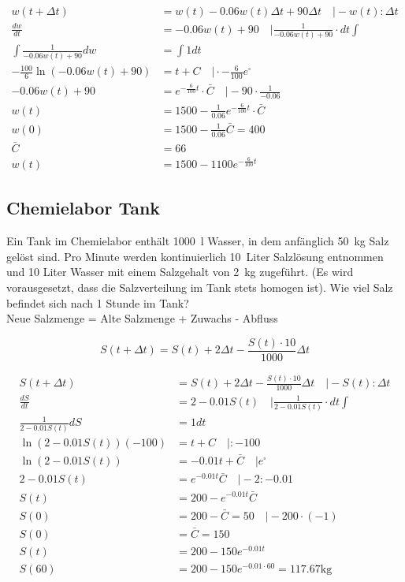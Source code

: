 \documentclass[a4paper, ngerman, 11pt]{scrarticle}
\begin{document}
	\begin{align*}
		w(t+\Delta t) &= w(t) - 0.06w(t)\Delta t + 90 \Delta t \quad \vert -w(t) : \Delta t\\
		\frac{dw}{dt} &= - 0.06w(t) + 90 \quad \vert \frac{1}{- 0.06w(t) + 90} \cdot dt \int\\
		\int\frac{1}{- 0.06w(t) + 90} dw &= \int1 dt\\
		-\frac{100}{6} \ln(- 0.06w(t) + 90) &= t + C \quad \vert \cdot -\frac{6}{100} e^\square\\
		- 0.06w(t) + 90 &= e^{-\frac{6}{100}t} \cdot \bar{C} \quad \vert -90 \cdot \frac{1}{-0.06}\\
		w(t) &= 1500 -\frac{1}{0.06}e^{-\frac{6}{100}t} \cdot \bar{C} \\
		w(0) &= 1500 - \frac{1}{0.06}\bar{C} = 400\\
		\bar{C} &= 66\\
		w(t) &= 1500 - 1100e^{-\frac{6}{100}t}
	\end{align*}
	
	
	\subsection*{Chemielabor Tank}
	Ein Tank im Chemielabor enthält 1000~l Wasser, in dem anfänglich 50~kg Salz gelöst sind. Pro Minute werden kontinuierlich 10~Liter Salzlösung entnommen und 10 Liter Wasser mit einem Salzgehalt von 2~kg zugeführt. (Es wird vorausgesetzt, dass die Salzverteilung im Tank stets homogen ist). Wie viel Salz befindet sich nach 1 Stunde im Tank?
	\\
	
	Neue Salzmenge = Alte Salzmenge + Zuwachs - Abfluss
	
	$$S(t + \Delta t) = S(t) + 2\Delta t - \frac{S(t)\cdot 10}{1000} \Delta t$$
	
	\begin{align*}
		S(t + \Delta t) &= S(t) + 2\Delta t - \frac{S(t)\cdot 10}{1000} \Delta t \quad \vert -S(t) : \Delta t\\
		\frac{dS}{dt} &= 2 - 0.01 S(t) \quad \vert \frac{1}{ 2 - 0.01 S(t)} \cdot dt \int\\
		\frac{1}{ 2 - 0.01 S(t)} dS &= 1 dt\\
		\ln(2 - 0.01 S(t)) (-100) &= t + C \quad \vert :-100\\
		\ln(2 - 0.01 S(t))&= -0.01t + \bar{C} \quad \vert e^\square\\
		2 - 0.01 S(t)&= e^{-0.01t}\bar{C} \quad \vert -2 : -0.01\\
		S(t)&= 200 - e^{-0.01t}\bar{C}\\
		S(0)&= 200 - \bar{C} = 50 \quad \vert -200 \cdot(-1)\\
		S(0)&=\bar{C} = 150\\
		S(t)&= 200 - 150e^{-0.01t}\\
		S(60)&= 200 - 150e^{-0.01\cdot 60} = 117.67\si{\kilogram}
	\end{align*}
\end{document}
